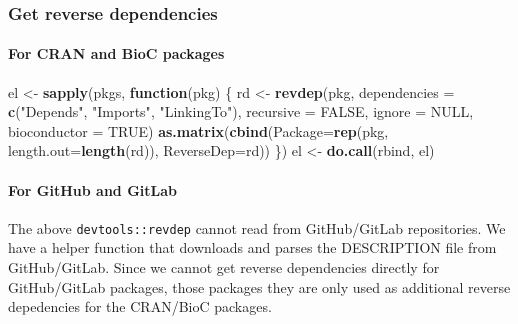\documentclass[]{article}
\newenvironment{Shaded}{\begin{snugshade}}{\end{snugshade}}
\newcommand{\ControlFlowTok}[1]{\textcolor[rgb]{0.13,0.29,0.53}{\textbf{#1}}}
\newcommand{\DataTypeTok}[1]{\textcolor[rgb]{0.13,0.29,0.53}{#1}}
\newcommand{\KeywordTok}[1]{\textcolor[rgb]{0.13,0.29,0.53}{\textbf{#1}}}
\newcommand{\NormalTok}[1]{#1}
\newcommand{\OtherTok}[1]{\textcolor[rgb]{0.56,0.35,0.01}{#1}}
\newcommand{\StringTok}[1]{\textcolor[rgb]{0.31,0.60,0.02}{#1}}
\let\oldparagraph\paragraph
\renewcommand{\paragraph}[1]{\oldparagraph{#1}\mbox{}}
\begin{document}
\hypertarget{get-reverse-dependencies}{%
\subsubsection*{Get reverse dependencies}\label{get-reverse-dependencies}}

\hypertarget{for-cran-and-bioc-packages}{%
\paragraph{For CRAN and BioC packages}\label{for-cran-and-bioc-packages}}

\begin{Shaded}
\begin{Highlighting}[]
\NormalTok{el <-}\StringTok{ }\KeywordTok{sapply}\NormalTok{(pkgs, }\ControlFlowTok{function}\NormalTok{(pkg) \{}
\NormalTok{  rd <-}\StringTok{ }\KeywordTok{revdep}\NormalTok{(pkg, }\DataTypeTok{dependencies =} \KeywordTok{c}\NormalTok{(}\StringTok{"Depends"}\NormalTok{, }\StringTok{"Imports"}\NormalTok{, }\StringTok{"LinkingTo"}\NormalTok{), }
               \DataTypeTok{recursive =} \OtherTok{FALSE}\NormalTok{, }\DataTypeTok{ignore =} \OtherTok{NULL}\NormalTok{, }\DataTypeTok{bioconductor =} \OtherTok{TRUE}\NormalTok{)}
  \KeywordTok{as.matrix}\NormalTok{(}\KeywordTok{cbind}\NormalTok{(}\DataTypeTok{Package=}\KeywordTok{rep}\NormalTok{(pkg, }\DataTypeTok{length.out=}\KeywordTok{length}\NormalTok{(rd)), }\DataTypeTok{ReverseDep=}\NormalTok{rd))}
\NormalTok{\})}
\NormalTok{el <-}\StringTok{ }\KeywordTok{do.call}\NormalTok{(rbind, el)}
\end{Highlighting}
\end{Shaded}

\hypertarget{for-github-and-gitlab}{%
\paragraph{For GitHub and GitLab}\label{for-github-and-gitlab}}

The above \texttt{devtools::revdep} cannot read from GitHub/GitLab repositories.
We have a helper function that downloads and parses the DESCRIPTION file from GitHub/GitLab.
Since we cannot get reverse dependencies directly for GitHub/GitLab packages, those packages they are only used as additional reverse depedencies for the CRAN/BioC packages.
\end{document}
